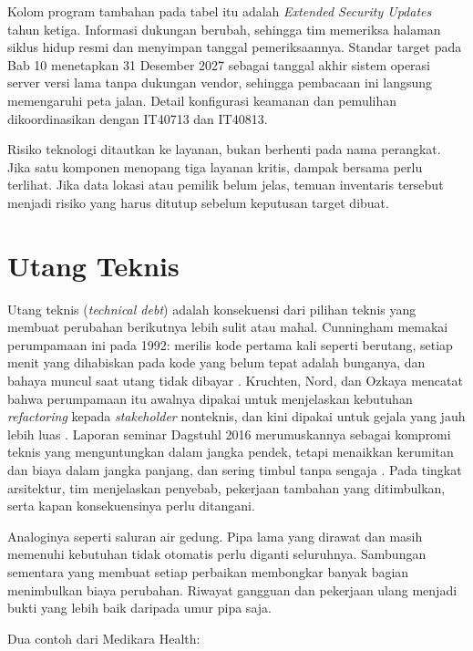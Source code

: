 Kolom program tambahan pada tabel itu adalah \textit{Extended Security Updates} tahun ketiga. Informasi dukungan berubah, sehingga tim
memeriksa halaman siklus hidup resmi dan menyimpan tanggal pemeriksaannya. Standar target pada Bab 10 menetapkan 31 Desember 2027 sebagai
tanggal akhir sistem operasi server versi lama tanpa dukungan vendor, sehingga pembacaan ini langsung memengaruhi peta jalan. Detail
konfigurasi keamanan dan pemulihan dikoordinasikan dengan IT40713 dan IT40813.

Risiko teknologi ditautkan ke layanan, bukan berhenti pada nama perangkat. Jika satu komponen menopang tiga layanan kritis, dampak bersama
perlu terlihat. Jika data lokasi atau pemilik belum jelas, temuan inventaris tersebut menjadi risiko yang harus ditutup sebelum keputusan
target dibuat.

\section{Utang Teknis}

Utang teknis (\textit{technical debt}) adalah konsekuensi dari pilihan teknis yang membuat perubahan berikutnya lebih sulit atau mahal.
Cunningham memakai perumpamaan ini pada 1992: merilis kode pertama kali seperti berutang, setiap menit yang dihabiskan pada kode yang
belum tepat adalah bunganya, dan bahaya muncul saat utang tidak dibayar \cite{c07-cunningham1992}. Kruchten, Nord, dan Ozkaya mencatat
bahwa perumpamaan itu awalnya dipakai untuk menjelaskan kebutuhan \textit{refactoring} kepada \textit{stakeholder} nonteknis, dan kini dipakai
untuk gejala yang jauh lebih luas \cite{c07-kruchten2012}. Laporan seminar Dagstuhl 2016 merumuskannya sebagai kompromi teknis yang menguntungkan
dalam jangka pendek, tetapi menaikkan kerumitan dan biaya dalam jangka panjang, dan sering timbul tanpa sengaja \cite{c07-avgeriou2016}. Pada tingkat
arsitektur, tim menjelaskan penyebab, pekerjaan tambahan yang ditimbulkan, serta kapan konsekuensinya perlu ditangani.

Analoginya seperti saluran air gedung. Pipa lama yang dirawat dan masih memenuhi kebutuhan tidak otomatis perlu diganti seluruhnya.
Sambungan sementara yang membuat setiap perbaikan membongkar banyak bagian menimbulkan biaya perubahan. Riwayat gangguan dan pekerjaan
ulang menjadi bukti yang lebih baik daripada umur pipa saja.

Dua contoh dari Medikara Health:

